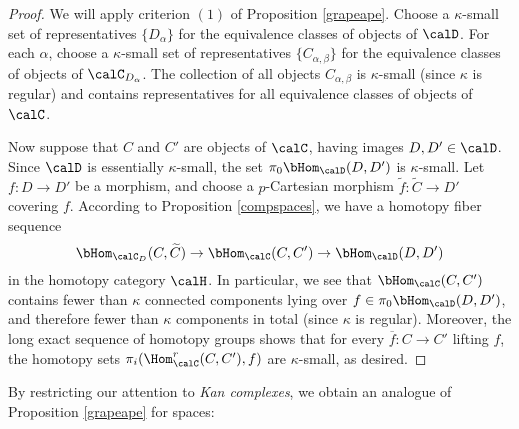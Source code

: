 \begin{proof}
We will apply criterion $(1)$ of Proposition \ref{grapeape}. Choose a $\kappa$-small set of representatives $\{ D_{\alpha} \}$ for the equivalence classes of objects of $\calD$. For each $\alpha$, choose a $\kappa$-small set of representatives $\{ C_{\alpha,\beta} \}$ for the equivalence classes of objects of $\calC_{D_{\alpha}}$. The collection of all objects
$C_{\alpha,\beta}$ is $\kappa$-small (since $\kappa$ is regular) and contains representatives for all equivalence classes of objects of $\calC$.

Now suppose that $C$ and $C'$ are objects of $\calC$, having images $D, D' \in \calD$.
Since $\calD$ is essentially $\kappa$-small, the set $\pi_0 \bHom_{\calD}(D,D')$ is $\kappa$-small. Let $f: D \rightarrow D'$ be a morphism, and choose a $p$-Cartesian morphism
$\widetilde{f}: \widetilde{C} \rightarrow D'$ covering $f$. According to Proposition \ref{compspaces}, we have a homotopy fiber sequence
$$ \bHom_{\calC_{D}}( C, \widetilde{C}) \rightarrow \bHom_{\calC}(C,C') \rightarrow
\bHom_{\calD}(D,D')$$
in the homotopy category $\calH$. In particular, we see that $\bHom_{\calC}(C,C')$ contains
fewer than $\kappa$ connected components lying over $f \in \pi_0 \bHom_{\calD}(D,D')$, and therefore fewer than $\kappa$ components in total (since $\kappa$ is regular). Moreover, the long exact sequence of homotopy groups shows that for every $\overline{f}: C \rightarrow C'$ lifting
$f$, the homotopy sets $\pi_{i}( \Hom^r_{\calC}(C,C'), f)$ are $\kappa$-small, as desired. 
\end{proof}

By restricting our attention to {\em Kan complexes}, we obtain an analogue of Proposition \ref{grapeape} for spaces:

